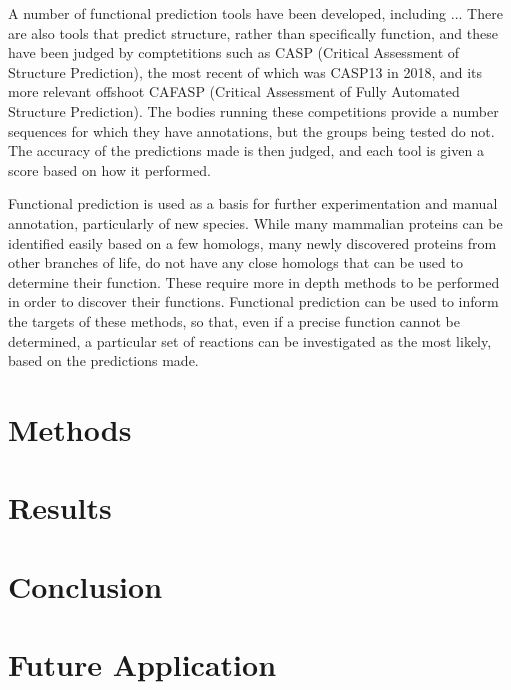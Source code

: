 \documentclass[12pt]{report}
\begin{document}
		A number of functional prediction tools have been developed, including ...  There are also tools that predict structure, rather than specifically function, and these have been judged by comptetitions such as CASP (Critical Assessment of Structure Prediction), the most recent of which was CASP13 in 2018, and its more relevant offshoot CAFASP (Critical Assessment of Fully Automated Structure Prediction).  The bodies running these competitions provide a number sequences for which they have annotations, but the groups being tested do not.  The accuracy of the predictions made is then judged, and each tool is given a score based on how it performed.%
		
		Functional prediction is used as a basis for further experimentation and manual annotation, particularly of new species.  While many mammalian proteins can be identified easily based on a few homologs, many newly discovered proteins from other branches of life, do not have any close homologs that can be used to determine their function.  These require more in depth methods to be performed in order to discover their functions.  Functional prediction can be used to inform the targets of these methods, so that, even if a precise function cannot be determined, a particular set of reactions can be investigated as the most likely, based on the predictions made. %
		
	\section{Methods}
		
		
		
	\section{Results}
		
		
				
	\section{Conclusion}
		
		
		
	\section{Future Application}
		
	
	{}
	
\end{document}
